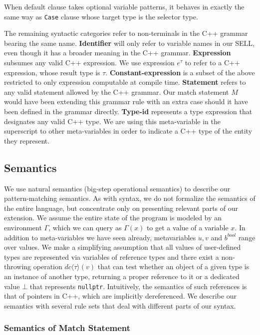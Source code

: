 \documentclass[preprint]{sigplanconf}
\makeatletter
\DeclareRobustCommand{\code}[1]{{\lstinline[breaklines=false,escapechar=@]{#1}}}
\newcommand{\DynCast}[2]{\ensuremath{dc\langle{#1}\rangle({#2})}}
\newcommand{\nullptr}{\ensuremath{\bot}}
\makeatother
\begin{document}
When default clause takes optional variable patterns, it behaves in 
exactly the same way as \code{Case} clause whose target type is the selector 
type.

The remaining syntactic categories refer to non-terminals in the C++ grammar 
bearing the same name. {\bf Identifier} will only refer to variable names in our 
SELL, even though it has a broader meaning in the C++ grammar. {\bf Expression}
subsumes any valid C++ expression. We use expression $e^\tau$ to refer to a C++ 
expression, whose result type is $\tau$. {\bf Constant-expression} is a subset 
of the above restricted to only expression computable at compile time. {\bf 
Statement} refers to any valid statement allowed by the C++ grammar. Our match 
statement $M$ would have been extending this grammar rule with an extra case 
should it have been defined in the grammar directly. {\bf Type-id} represents a 
type expression that designates any valid C++ type. We are using this 
meta-variable in the superscript to other meta-variables in order to indicate a 
C++ type of the entity they represent.

\subsection{Semantics}
\label{sec:sem}

We use natural semantics\cite{Kahn87} (big-step operational semantics) to 
describe our pattern-matching semantics. As with syntax, we do not formalize the 
semantics of the entire language, but concentrate only on presenting relevant 
parts of our extension. We assume the entire state of the program is modeled by 
an environment $\Gamma$, which we can query as $\Gamma(x)$ to get a value of a 
variable $x$. In addition to meta-variables we have seen already, metavariables 
$u,v$ and $b^{bool}$ range over values. We make a simplifying assumption that 
all values of user-defined types are represented via variables of reference 
types and there exist a non-throwing operation \DynCast{\tau}{v} that can test 
whether an object of a given type is an instance of another type, returning a 
proper reference to it or a dedicated value \nullptr{} that represents 
\code{nullptr}. Intuitively, the semantics of such references is that of 
pointers in C++, which are implicitly dereferenced. We describe our semantics 
with several rule sets that deal with different parts of our syntax.

\subsubsection{Semantics of Match Statement}
\label{sec:semms}
\end{document}
